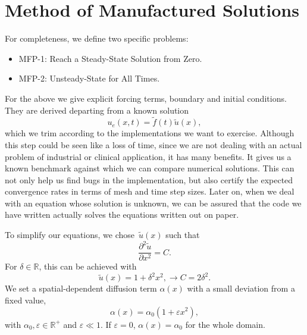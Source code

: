\documentclass[../../main.tex]{subfiles}
\begin{document}
\section{Method of Manufactured Solutions}
\label{sec:1d_fom_toy_problem}

For completeness, we define two specific problems:
\begin{itemize}
    \item MFP-1: Reach a Steady-State Solution from Zero.
    \item MFP-2: Unsteady-State for All Times.
\end{itemize}
For the above we give explicit forcing terms, boundary and initial conditions.
They are derived departing from a known solution
\begin{equation}
    u_e(x,t) = \tilde{f}(t) \tilde{u}(x),
\end{equation}
which we trim according to the implementations we want to exercise.
Although this step could be seen like a loss of time, since we are not dealing with an actual problem of industrial or clinical application, it has many benefits.
It gives us a known benchmark against which we can compare numerical solutions.
This can not only help us find bugs in the implementation, but also certify the expected convergence rates in terms of mesh and time step sizes.
Later on, when we deal with an equation whose solution is unknown, we can be assured that the code we have written actually solves the equations written out on paper. 

To simplify our equations, we chose~$\tilde{u}(x)$ such that
\begin{equation}
    \frac{\partial^2\tilde{u}}{\partial x^2} = C.
\end{equation}
For $\delta\in\mathbb{R}$, this can be achieved with 
\begin{equation}
    \tilde{u}(x) = 1 + \delta^2 x^2, \rightarrow C = 2 \delta^2.
\end{equation}
We set a spatial-dependent diffusion term $\alpha(x)$ with a small deviation from a fixed value,
\begin{equation}
    \label{eq:1d_fom_mfp_diffusion_term}
    \alpha(x) = \alpha_0(1 + \varepsilon x^2),
\end{equation}
with $\alpha_0, \varepsilon \in \mathbb{R}^{+}$ and $\varepsilon \ll 1$.
If $\varepsilon=0$, $\alpha(x) = \alpha_0$ for the whole domain.

\end{document}
